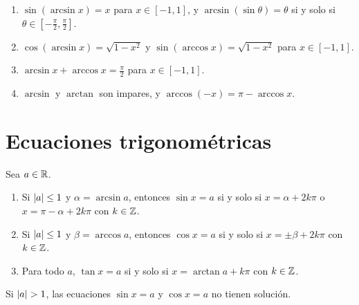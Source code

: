 \begin{proposicion}\label{prop:inversas}
\begin{enumerate}
  \item $\sin(\arcsin x)=x$ para $x\in[-1,1]$, y $\arcsin(\sin\theta)=\theta$ si y solo si $\theta\in[-\frac{\pi}{2},\frac{\pi}{2}]$.
  \item $\cos(\arcsin x)=\sqrt{1-x^{2}}$ y $\sin(\arccos x)=\sqrt{1-x^{2}}$ para $x\in[-1,1]$.
  \item $\arcsin x+\arccos x=\frac{\pi}{2}$ para $x\in[-1,1]$.
  \item $\arcsin$ y $\arctan$ son impares, y $\arccos(-x)=\pi-\arccos x$.
\end{enumerate}
\end{proposicion}

\addtocounter{definicion}{1}%

\section{Ecuaciones trigonométricas}

\begin{teorema}\label{teo:ecuaciones}
Sea $a\in\mathbb{R}$.
\begin{enumerate}
  \item Si $\lvert a\rvert\le1$ y $\alpha=\arcsin a$, entonces $\sin x=a$ si y solo si $x=\alpha+2k\pi$ o $x=\pi-\alpha+2k\pi$ con $k\in\mathbb{Z}$.
  \item Si $\lvert a\rvert\le1$ y $\beta=\arccos a$, entonces $\cos x=a$ si y solo si $x=\pm\beta+2k\pi$ con $k\in\mathbb{Z}$.
  \item Para todo $a$, $\tan x=a$ si y solo si $x=\arctan a+k\pi$ con $k\in\mathbb{Z}$.
\end{enumerate}
Si $\lvert a\rvert>1$, las ecuaciones $\sin x=a$ y $\cos x=a$ no tienen solución.
\end{teorema}

\addtocounter{definicion}{1}%

\addtocounter{definicion}{1}%

\addtocounter{definicion}{1}%

